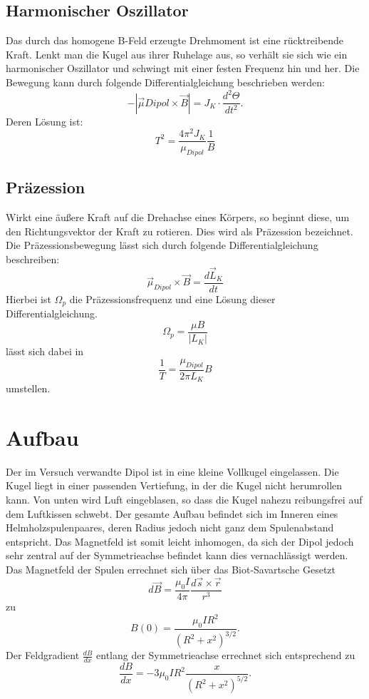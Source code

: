   \subsection{Harmonischer Oszillator}
  Das durch das homogene B-Feld erzeugte Drehmoment ist eine rücktreibende Kraft. Lenkt man die Kugel aus ihrer Ruhelage aus, so verhält sie sich wie ein harmonischer Oszillator und schwingt mit einer festen Frequenz hin und her.
Die Bewegung kann durch folgende Differentialgleichung beschrieben werden:
\begin{equation}
-|\vec{\mu}Dipol \times \vec{B}| = J_K \cdot \frac{d^2 \Theta}{dt^2}.
\end{equation}
Deren Lösung ist:
\begin{equation}
T^2=\frac{4\pi^2J_K}{\mu_{Dipol}} \frac{1}{B}
\label{oszi}
\end{equation}
  \subsection{Präzession}
 Wirkt eine äußere Kraft auf die Drehachse eines Körpers, so beginnt diese, um den Richtungsvektor der Kraft zu rotieren. Dies wird als Präzession bezeichnet.
Die Präzessionsbewegung lässt sich durch folgende Differentialgleichung beschreiben:
\begin{equation}
\vec{\mu}_{Dipol} \times \vec{B} = \frac{d \vec{L}_K}{dt}
\end{equation}
Hierbei ist $\Omega_p$ die Präzessionsfrequenz und eine Lösung dieser Differentialgleichung.
\begin{equation}
\Omega_p = \frac{\mu B}{|L_K|}
\end{equation}
lässt sich dabei in
\begin{equation}
\frac{1}{T} = \frac{\mu_{Dipol}}{2 \pi L_K} B
\label{prae}
\end{equation}
umstellen.
\section{Aufbau}
Der im Versuch verwandte Dipol ist in eine kleine Vollkugel eingelassen. Die Kugel liegt in einer passenden Vertiefung, in der die Kugel nicht herumrollen kann. Von unten wird Luft eingeblasen, so dass die Kugel nahezu reibungsfrei auf dem Luftkissen schwebt.
Der gesamte Aufbau befindet sich im Inneren eines Helmholzspulenpaares, deren Radius jedoch nicht ganz dem Spulenabstand entspricht. Das Magnetfeld ist somit leicht inhomogen, da sich der Dipol jedoch sehr zentral auf der Symmetrieachse befindet kann dies vernachlässigt werden.
Das Magnetfeld der Spulen errechnet sich über das Biot-Savartsche Gesetzt
\begin{equation}
d \vec{B} = \frac{\mu_0 I}{4\pi} \frac{d \vec{s} \times \vec{r}}{r^3}
\end{equation} 
zu
\begin{equation}
B(0)=\frac{\mu_0 IR^2}{(R^2+x^2)^{3/2}}.
\end{equation}
Der Feldgradient $\frac{dB}{dx}$ entlang der Symmetrieachse errechnet sich entsprechend zu
\begin{equation}
\frac{dB}{dx} = -3\mu_0 IR^2 \frac{x}{(R^2+x^2)^{5/2}}.
\end{equation}
